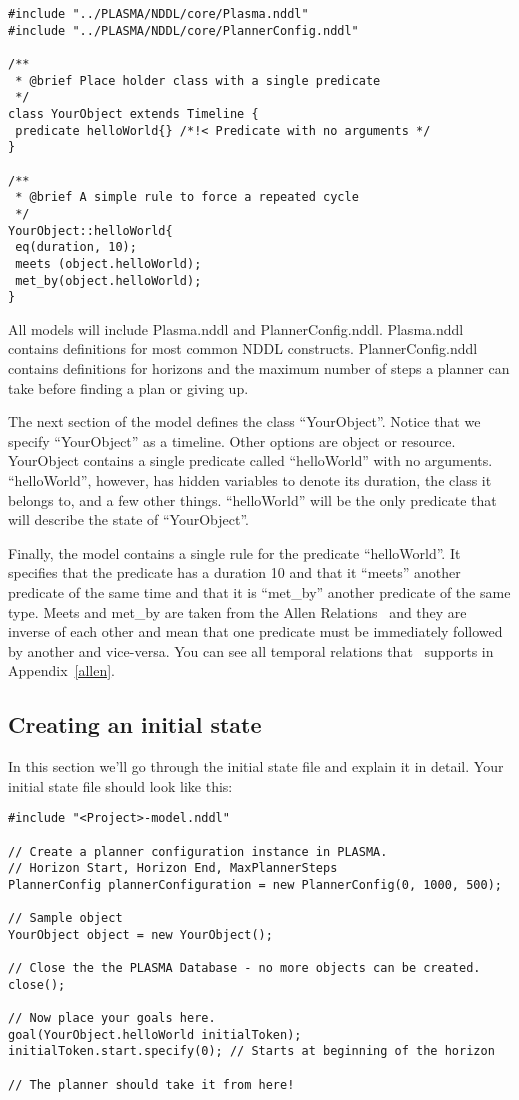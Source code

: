 \documentclass[10pt, letterpaper, twoside]{article}
\begin{document}
\begin{verbatim}
#include "../PLASMA/NDDL/core/Plasma.nddl"
#include "../PLASMA/NDDL/core/PlannerConfig.nddl"

/**
 * @brief Place holder class with a single predicate
 */
class YourObject extends Timeline {
 predicate helloWorld{} /*!< Predicate with no arguments */
}

/**
 * @brief A simple rule to force a repeated cycle
 */
YourObject::helloWorld{
 eq(duration, 10);
 meets (object.helloWorld);
 met_by(object.helloWorld);
}
\end{verbatim}

All models will include Plasma.nddl and PlannerConfig.nddl.  Plasma.nddl
contains definitions for most common NDDL constructs.  PlannerConfig.nddl
contains definitions for horizons and the maximum number of steps a planner
can take before finding a plan or giving up.

The next section of the model defines the class ``YourObject''.  Notice
that we specify ``YourObject'' as a timeline.  Other options are object or
resource.  YourObject contains a single predicate called ``helloWorld''
with no arguments.  ``helloWorld'', however, has hidden variables to
denote its duration, the class it belongs to, and a few other
things. ``helloWorld'' will be the only predicate that will describe the 
state of ``YourObject''.

Finally, the model contains a single rule for the predicate
``helloWorld''.  It specifies that the predicate has a duration 10 and that
it ``meets'' another predicate of the same time and that it is ``met\_by''
another predicate of the same type.  Meets and met\_by are taken from the
Allen Relations~\cite{allen} and they are inverse of each other and mean
that one predicate must be immediately followed by another and vice-versa.
You can see all temporal relations that \ET\, supports in Appendix~\ref{allen}.

\subsection{Creating an initial state}
\label{initial}
In this section we'll go through the initial state file and explain it in
detail. Your initial state file should look like this:

\begin{verbatim}
#include "<Project>-model.nddl"

// Create a planner configuration instance in PLASMA.
// Horizon Start, Horizon End, MaxPlannerSteps
PlannerConfig plannerConfiguration = new PlannerConfig(0, 1000, 500);

// Sample object
YourObject object = new YourObject();

// Close the the PLASMA Database - no more objects can be created.
close();

// Now place your goals here.
goal(YourObject.helloWorld initialToken);
initialToken.start.specify(0); // Starts at beginning of the horizon

// The planner should take it from here!
\end{verbatim}
\end{document}

